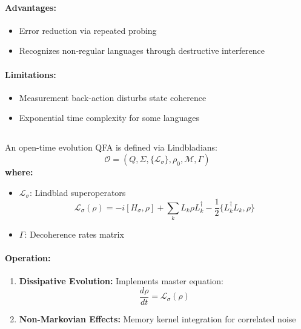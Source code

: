 \paragraph{Advantages:}
\begin{itemize}
    \item Error reduction via repeated probing
    \item Recognizes non-regular languages through destructive interference
\end{itemize}

\paragraph{Limitations:}
\begin{itemize}
    \item Measurement back-action disturbs state coherence
    \item Exponential time complexity for some languages
\end{itemize}

\subsection{}
\label{subsec:otqfa}

\begin{definition}
An open-time evolution QFA is defined via Lindbladians:
\[
\mathcal{O} = (Q, \Sigma, \{\mathcal{L}_\sigma\}, \rho_0, \mathcal{M}, \Gamma)
\]
\textbf{where:}
\begin{itemize}
    \item $\mathcal{L}_\sigma$: Lindblad superoperators
    \[
    \mathcal{L}_\sigma(\rho) = -i[H_\sigma,\rho] + \sum_k L_k\rho L_k^\dagger - \frac{1}{2}\{L_k^\dagger L_k, \rho\}
    \]
    \item $\Gamma$: Decoherence rates matrix
\end{itemize}
\end{definition}

\paragraph{Operation:}
\begin{enumerate}
    \item \textbf{Dissipative Evolution:} Implements master equation:
    \[
    \frac{d\rho}{dt} = \mathcal{L}_\sigma(\rho)
    \]
    \item \textbf{Non-Markovian Effects:} Memory kernel integration for correlated noise
\end{enumerate}

